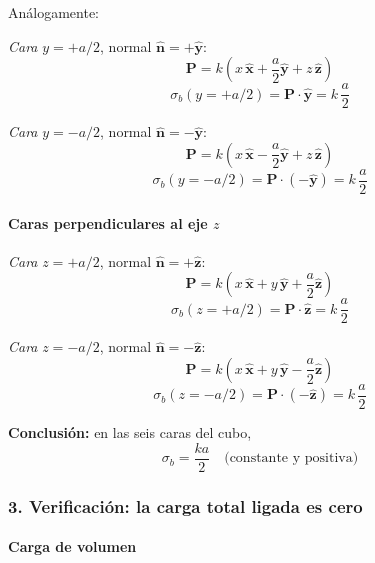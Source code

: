 \documentclass{article}
\begin{document}
Análogamente:

\emph{Cara} $y = +a/2$, normal $\hat{\mathbf{n}} = +\hat{\mathbf{y}}$:
\[
\mathbf{P} = k\left(x\,\hat{\mathbf{x}} + \frac{a}{2}\hat{\mathbf{y}} + z\,\hat{\mathbf{z}}\right)
\]
\begin{equation}
\sigma_{b}(y=+a/2)
= \mathbf{P}\cdot\hat{\mathbf{y}}
= k\,\frac{a}{2}
\label{eq:sigma-y-mas}
\end{equation}

\emph{Cara} $y = -a/2$, normal $\hat{\mathbf{n}} = -\hat{\mathbf{y}}$:
\[
\mathbf{P} = k\left(x\,\hat{\mathbf{x}} - \frac{a}{2}\hat{\mathbf{y}} + z\,\hat{\mathbf{z}}\right)
\]
\begin{equation}
\sigma_{b}(y=-a/2)
= \mathbf{P}\cdot(-\hat{\mathbf{y}})
= k\,\frac{a}{2}
\label{eq:sigma-y-menos}
\end{equation}

\paragraph{Caras perpendiculares al eje $z$}

\emph{Cara} $z = +a/2$, normal $\hat{\mathbf{n}} = +\hat{\mathbf{z}}$:
\[
\mathbf{P} = k\left(x\,\hat{\mathbf{x}} + y\,\hat{\mathbf{y}} + \frac{a}{2}\hat{\mathbf{z}}\right)
\]
\begin{equation}
\sigma_{b}(z=+a/2)
= \mathbf{P}\cdot\hat{\mathbf{z}}
= k\,\frac{a}{2}
\label{eq:sigma-z-mas}
\end{equation}

\emph{Cara} $z = -a/2$, normal $\hat{\mathbf{n}} = -\hat{\mathbf{z}}$:
\[
\mathbf{P} = k\left(x\,\hat{\mathbf{x}} + y\,\hat{\mathbf{y}} - \frac{a}{2}\hat{\mathbf{z}}\right)
\]
\begin{equation}
\sigma_{b}(z=-a/2)
= \mathbf{P}\cdot(-\hat{\mathbf{z}})
= k\,\frac{a}{2}
\label{eq:sigma-z-menos}
\end{equation}

\textbf{Conclusión:} en las seis caras del cubo,
\begin{equation}
\sigma_{b} = \frac{k a}{2} \quad \text{(constante y positiva)}
\label{eq:sigma-todas-caras}
\end{equation}

\subsubsection*{3. Verificación: la carga total ligada es cero}

\paragraph{Carga de volumen}
\end{document}
